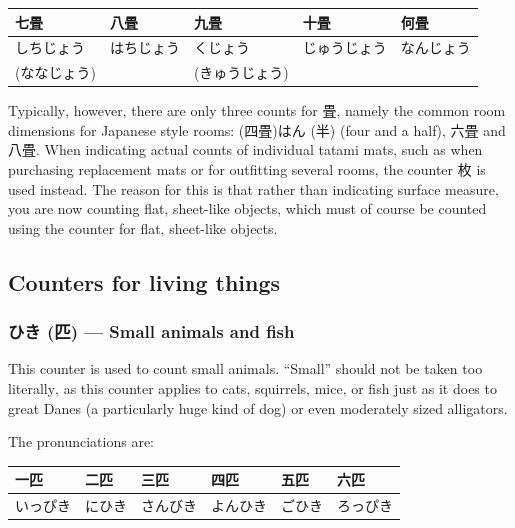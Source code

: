 \documentclass[11pt, b5paper, twoside, openright, onecolumn]{book}
\makeatletter
\newcommand*{\rubystack}[2]{{\relscale{0.5}%
  \begin{tabular}[b]{@{}c@{}}%
    {#1}\\%
   {\textscale{2}{#2}}%
  \end{tabular}}%
}
\DeclareRobustCommand*{\ruby}[2]{%
  \mbox{%
    \setlength{\parskip}{0ex}%
    \BeginAccSupp{method=pdfstringdef,ActualText={#1}}%
      \rubystack{\phantom{#2}}{#1}%
      \llap{%
        \rubystack{#2}{\phantom{#1}}%
      }%
    \EndAccSupp{}%
  }%
}
\renewcommand*{\ruby}[2]{#2 (#1)}%
\newenvironment{mytabular}[1]{\noindent\hspace{0.4in}
\begin{tabular}[h]{#1}}{\end{tabular}}
\makeatother
\begin{document}
\smaller
\begin{mytabular}{| l  l  l  l  l |}\hline 
\rule{0pt}{2.4ex}七畳 & 八畳 & 九畳 & 十畳 & 何畳\\ 
\hline
\rule{0pt}{2.4ex}しちじょう & はちじょう & くじょう & じゅうじょう & なんじょう\\ 
\rule{0pt}{2.4ex}(ななじょう) &  & (きゅうじょう) &  & \\ 
\hline 
\end{mytabular}
\larger
\vspace{0.5cm}


Typically‚ however‚ there are only three counts for 畳‚ namely the common room dimensions for Japanese style rooms: \ruby{四畳}{}\ruby{半}{はん} (four and a half)‚ 六畳 and 八畳. When indicating actual counts of individual tatami mats‚ such as when purchasing replacement mats or for outfitting several rooms‚ the counter 枚 is used instead. The reason for this is that rather than indicating surface measure‚ you are now counting flat‚ sheet-like objects‚ which must of course be counted using the counter for flat‚ sheet-like objects.

\subsection{Counters for living things}

\subsubsection{\ruby{匹}{ひき} — Small animals and fish}

This counter is used to count small animals. “Small” should not be taken too literally‚ as this counter applies to cats‚ squirrels‚ mice‚ or fish just as it does to great Danes (a particularly huge kind of dog) or even moderately sized alligators.

The pronunciations are:

\vspace{0.5cm}
\smaller
\begin{mytabular}{| l  l  l  l  l  l |}\hline 
\rule{0pt}{2.4ex}一匹 & 二匹 & 三匹 & 四匹 & 五匹 & 六匹\\ 
\hline
\rule{0pt}{2.4ex}いっぴき & にひき & さんびき & よんひき & ごひき & ろっぴき\\ 
\hline 
\end{mytabular}
\larger
\vspace{0.5cm}
\end{document}
